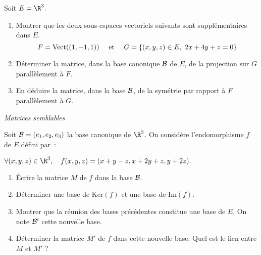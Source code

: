 \documentclass[a4paper,10pt]{report}
\begin{document}
\begin{Exercice}{} Soit $E=\R^3.$

\begin{enumerate}

\item Montrer que les deux sous-espaces vectoriels suivants sont
suppl\'ementaires dans $E.$
$$F=\hbox{Vect}((1,-1,1))\quad\hbox{ et }\quad G=\{(x,y,z)\in
E,\ 2x+4y+z=0\}$$

\item D\'eterminer la matrice, dans la base canonique ${\cal B}$
de $E$, de la projection sur $G$ parallèlement à $F.$

\item En d\'eduire la matrice, dans la base ${\cal B}$, de la
sym\'etrie par rapport \`a $F$ parallèlement à $G.$
\end{enumerate}
\end{Exercice} 

\medskip

\begin{center}
\textit{{ {\large Matrices semblables}}}
\end{center}

\medskip


\begin{Exercice}{} Soit ${\cal B}=(e_1,e_2,e_3)$ la base canonique de $\R^3.$ On consid\`ere
l'endomorphisme $f$ de $E$ d\'efini par~:

\begin{center}
$\forall (x,y,z)\in\R^3,\quad f(x,y,z)=(x+y-z,x+2y+z,y+2z).$
\end{center}

\begin{enumerate}

\item Écrire la matrice $M$ de $f$ dans la base ${\cal B}.$

\item D\'eterminer une base de $\textrm{Ker}(f)$ et une base de $\textrm{Im}(f)$.

\item Montrer que la r\'eunion des bases pr\'ec\'edentes constitue une base de $E$. On note ${\cal B}'$ cette nouvelle base.

\item  D\'eterminer la matrice $M'$ de $f$ dans cette nouvelle base. Quel est le lien entre $M$ et $M'$ ?
\end{enumerate}

\end{Exercice}
\end{document}
